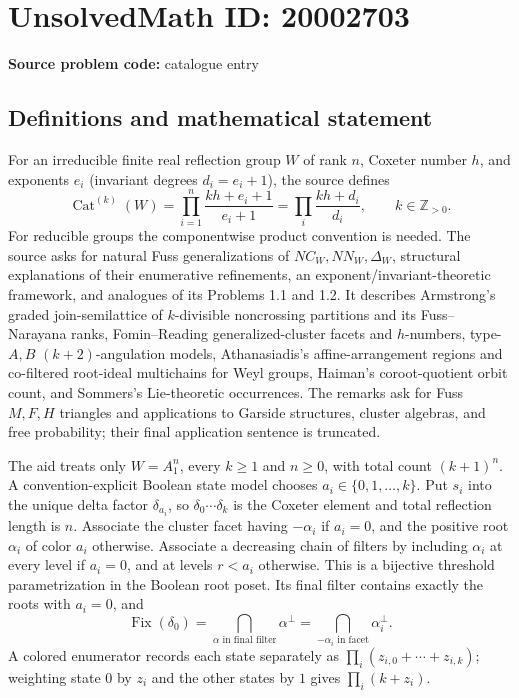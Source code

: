 \documentclass[11pt]{article}
\newcommand{\Z}{\mathbb{Z}}
\begin{document}
\section*{UnsolvedMath ID: 20002703}
\textbf{Source problem code:} catalogue entry
\subsection{Definitions and mathematical statement}
For an irreducible finite real reflection group $W$ of rank $n$, Coxeter number $h$, and exponents $e_i$ (invariant degrees $d_i=e_i+1$), the source defines
\[
 \operatorname{Cat}^{(k)}(W)=\prod_{i=1}^n\frac{kh+e_i+1}{e_i+1}
 =\prod_i\frac{kh+d_i}{d_i},\qquad k\in\Z_{>0}.
\]
For reducible groups the componentwise product convention is needed. The source asks for natural Fuss generalizations of $NC_W,NN_W,\Delta_W$, structural explanations of their enumerative refinements, an exponent/invariant-theoretic framework, and analogues of its Problems 1.1 and 1.2. It describes Armstrong's graded join-semilattice of $k$-divisible noncrossing partitions and its Fuss--Narayana ranks, Fomin--Reading generalized-cluster facets and $h$-numbers, type-$A,B$ $(k+2)$-angulation models, Athanasiadis's affine-arrangement regions and co-filtered root-ideal multichains for Weyl groups, Haiman's coroot-quotient orbit count, and Sommers's Lie-theoretic occurrences. The remarks ask for Fuss $M,F,H$ triangles and applications to Garside structures, cluster algebras, and free probability; their final application sentence is truncated.

The aid treats only $W=A_1^n$, every $k\ge1$ and $n\ge0$, with total count $(k+1)^n$. A convention-explicit Boolean state model chooses $a_i\in\{0,1,\ldots,k\}$. Put $s_i$ into the unique delta factor $\delta_{a_i}$, so $\delta_0\cdots\delta_k$ is the Coxeter element and total reflection length is $n$. Associate the cluster facet having $-\alpha_i$ if $a_i=0$, and the positive root $\alpha_i$ of color $a_i$ otherwise. Associate a decreasing chain of filters by including $\alpha_i$ at every level if $a_i=0$, and at levels $r<a_i$ otherwise. This is a bijective threshold parametrization in the Boolean root poset. Its final filter contains exactly the roots with $a_i=0$, and
\[
 \operatorname{Fix}(\delta_0)
 =\bigcap_{\alpha\text{ in final filter}}\alpha^\perp
 =\bigcap_{-\alpha_i\text{ in facet}}\alpha_i^\perp.
\]
A colored enumerator records each state separately as $\prod_i(z_{i,0}+\cdots+z_{i,k})$; weighting state $0$ by $z_i$ and the other states by $1$ gives $\prod_i(k+z_i)$.
\end{document}
